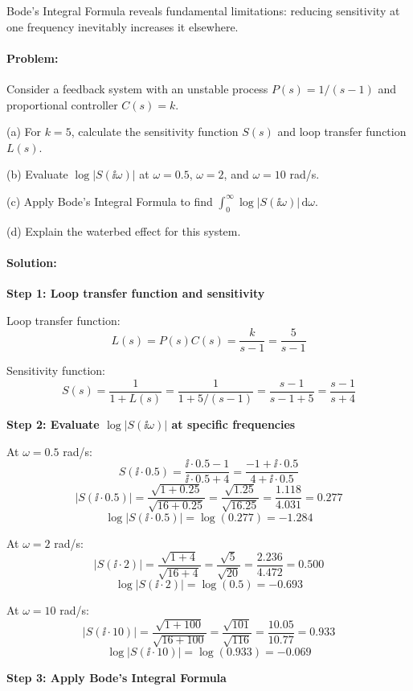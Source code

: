 \documentclass[11pt,a4paper]{article}
\begin{document}
Bode's Integral Formula reveals fundamental limitations: reducing sensitivity at one frequency inevitably increases it elsewhere.

\paragraph{Problem:}
Consider a feedback system with an unstable process $P(s) = 1/(s-1)$ and proportional controller $C(s) = k$. 

(a) For $k = 5$, calculate the sensitivity function $S(s)$ and loop transfer function $L(s)$.

(b) Evaluate $\log|S(\ii\omega)|$ at $\omega = 0.5$, $\omega = 2$, and $\omega = 10$ rad/s.

(c) Apply Bode's Integral Formula to find $\int_0^\infty \log|S(\ii\omega)|\,\mathrm{d}\omega$.

(d) Explain the waterbed effect for this system.

\paragraph{Solution:}

\textbf{Step 1: Loop transfer function and sensitivity}

Loop transfer function:
\[
L(s) = P(s)C(s) = \frac{k}{s-1} = \frac{5}{s-1}
\]

Sensitivity function:
\[
S(s) = \frac{1}{1 + L(s)} = \frac{1}{1 + 5/(s-1)} = \frac{s-1}{s-1+5} = \frac{s-1}{s+4}
\]

\textbf{Step 2: Evaluate $\log|S(\ii\omega)|$ at specific frequencies}

At $\omega = 0.5$ rad/s:
\[
S(\ii \cdot 0.5) = \frac{\ii \cdot 0.5 - 1}{\ii \cdot 0.5 + 4} = \frac{-1 + \ii \cdot 0.5}{4 + \ii \cdot 0.5}
\]
\[
|S(\ii \cdot 0.5)| = \frac{\sqrt{1 + 0.25}}{\sqrt{16 + 0.25}} = \frac{\sqrt{1.25}}{\sqrt{16.25}} = \frac{1.118}{4.031} = 0.277
\]
\[
\log|S(\ii \cdot 0.5)| = \log(0.277) = -1.284
\]

At $\omega = 2$ rad/s:
\[
|S(\ii \cdot 2)| = \frac{\sqrt{1 + 4}}{\sqrt{16 + 4}} = \frac{\sqrt{5}}{\sqrt{20}} = \frac{2.236}{4.472} = 0.500
\]
\[
\log|S(\ii \cdot 2)| = \log(0.5) = -0.693
\]

At $\omega = 10$ rad/s:
\[
|S(\ii \cdot 10)| = \frac{\sqrt{1 + 100}}{\sqrt{16 + 100}} = \frac{\sqrt{101}}{\sqrt{116}} = \frac{10.05}{10.77} = 0.933
\]
\[
\log|S(\ii \cdot 10)| = \log(0.933) = -0.069
\]

\textbf{Step 3: Apply Bode's Integral Formula}
\end{document}
